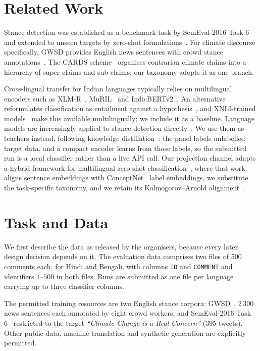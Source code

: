 \documentclass{ceurart}
\begin{document}
\section{Related Work}

Stance detection was established as a benchmark task by SemEval-2016 Task
6~\cite{mohammad2016} and extended to unseen targets by zero-shot
formulations~\cite{allaway2020}. For climate discourse specifically, GWSD
provides English news sentences with crowd stance annotations~\cite{luo2020}.
The CARDS scheme~\cite{coan2021} organises contrarian climate claims into a
hierarchy of super-claims and sub-claims; our taxonomy adopts it as one
branch.

Cross-lingual transfer for Indian languages typically relies on multilingual
encoders such as XLM-R~\cite{conneau2020}, MuRIL~\cite{khanuja2021} and
IndicBERTv2~\cite{doddapaneni2023}. An alternative reformulates
classification as entailment against a hypothesis~\cite{yin2019}, and
XNLI-trained models~\cite{conneau2018xnli} make this available
multilingually; we include it as a baseline. Language models are
increasingly applied to stance detection directly~\cite{pangtey2025}. We use
them as teachers instead, following knowledge distillation~\cite{hinton2015}:
the panel labels unlabelled target data, and a compact encoder learns from
those labels, so the submitted run is a local classifier rather than a live
API call. Our projection channel adapts a hybrid framework for multilingual
zero-shot classification~\cite{deb2026}; where that work aligns sentence
embeddings with ConceptNet~\cite{speer2017} label embeddings, we substitute
the task-specific taxonomy, and we retain its Kolmogorov--Arnold
alignment~\cite{liu2025kan}.

\section{Task and Data}
\label{sec:data}

We first describe the data as released by the organisers, because every
later design decision depends on it. The evaluation data comprises two files
of 500 comments each, for Hindi and Bengali, with columns \texttt{ID} and
\texttt{COMMENT} and identifiers $1$--$500$ in both files. Runs are
submitted as one file per language carrying up to three classifier columns.

The permitted training resources are two English stance corpora:
GWSD~\cite{luo2020}, 2\,300 news sentences each annotated by eight crowd
workers, and SemEval-2016 Task 6~\cite{mohammad2016} restricted to the
target \emph{``Climate Change is a Real Concern''} (395 tweets). Other
public data, machine translation and synthetic generation are explicitly
permitted.
\end{document}
